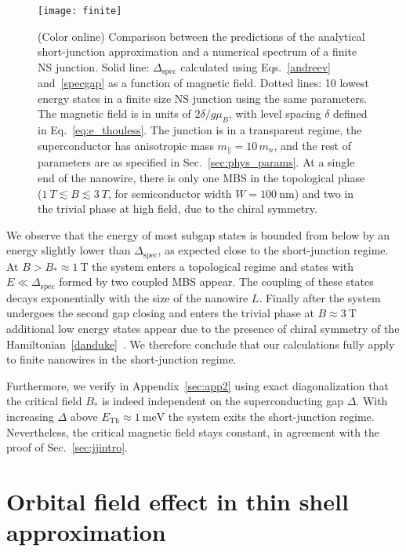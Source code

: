\documentclass[twocolumn, notitlepage, 10pt, aps, floatfix, showpacs, prb, citeautoscript]{revtex4-1}
\begin{document}
\begin{figure}[t]
\texttt{[image: finite]}
\caption{(Color online) Comparison between the predictions of the analytical short-junction approximation and a numerical spectrum of a finite NS junction.
Solid line: $\Delta_\textrm{spec}$ calculated using Eqs.~\eqref{andreev} and~\eqref{specgap} as a function of magnetic field.
Dotted lines: 10 lowest energy states in a finite size NS junction using the same parameters.
The magnetic field is in units of $2\delta/g\mu_B$, with level spacing $\delta$ defined in Eq.~\eqref{eq:e_thouless}.
The junction is in a transparent regime, the superconductor has anisotropic mass $m_\parallel = 10\, m_n$, and the rest of parameters are as specified in Sec.~\ref{sec:phys_params}.
At a single end of the nanowire, there is only one MBS in the topological phase ($\SI{1}{T}\lesssim B \lesssim \SI{3}{T}$, for semiconductor width $W=\SI{100}{\nm}$) and two in the trivial phase at high field, due to the chiral symmetry.}
\label{fig:finite}
\end{figure}

We observe that the energy of most subgap states is bounded from below by an energy slightly lower than $\Delta_\textrm{spec}$, as expected close to the short-junction regime.
At $B > B_* \approx \SI{1}{\tesla}$ the system enters a topological regime and states with $E \ll \Delta_\textrm{spec}$ formed by two coupled MBS appear.
The coupling of these states decays exponentially with the size of the nanowire $L$.
Finally after the system undergoes the second gap closing and enters the trivial phase at $B \approx \SI{3}{\tesla}$ additional low energy states appear due to the presence of chiral symmetry of the Hamiltonian~\eqref{danduke}~\cite{Schnyder2009, Ryu2010, Tewari2012}.
We therefore conclude that our calculations fully apply to finite nanowires in the short-junction regime.

Furthermore, we verify in Appendix~\ref{sec:app2} using exact diagonalization that the critical field $B_*$ is indeed independent on the superconducting gap $\Delta$.
With increasing $\Delta$ above $E_\mathrm{Th}\approx \SI{1}{\meV}$ the system exits the short-junction regime. Nevertheless, the critical magnetic field stays constant, in agreement with the proof of Sec.~\ref{sec:jjintro}.

\section{Orbital field effect in thin shell approximation}
\label{sec:orb}
\end{document}

